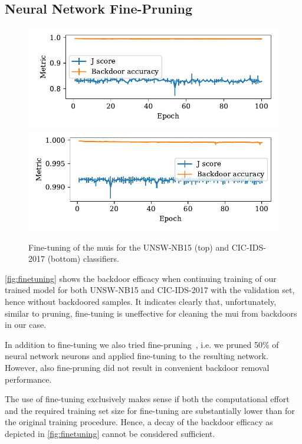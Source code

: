 \documentclass[10pt,sigconf,letterpaper,dvipsnames]{acmart}
\begin{document}
\subsection{Neural Network Fine-Pruning}
\begin{figure}[t]
\includegraphics[width=\columnwidth]{figures/finetuning_2015.pdf}
\includegraphics[width=\columnwidth]{figures/finetuning_2017.pdf}
\caption{Fine-tuning of the \glspl{mui} for the UNSW-NB15 (top) and CIC-IDS-2017 (bottom) classifiers.}
\label{fig:finetuning}
\end{figure}
\autoref{fig:finetuning} shows the backdoor efficacy when continuing training of our trained model for both UNSW-NB15 and CIC-IDS-2017 with the validation set, hence without backdoored samples. 
It indicates clearly that, unfortunately, similar to pruning, fine-tuning is uneffective for cleaning the \gls{mui} from backdoors in our case. 

In addition to fine-tuning we also tried fine-pruning~\cite{liu_fine-pruning:_2018}, i.e. we pruned 50\% of neural network neurons and applied fine-tuning to the resulting network. However, also fine-pruning did not result in convenient backdoor removal performance.

The use of fine-tuning exclusively makes  sense if both the computational effort and the required training set size for fine-tuning are substantially lower than for the original training procedure. Hence, a decay of the backdoor efficacy as depicted in \autoref{fig:finetuning} cannot be considered sufficient.
\end{document}
